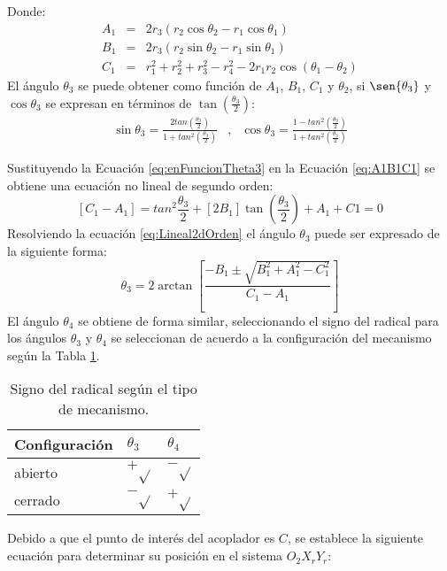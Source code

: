 Donde:
\begin{eqnarray}
A_1&=& 2r_3(r_2\cos{\theta_2}-r_1\cos{\theta_1}) \label{eq:A1} \\
B_1&=& 2r_3(r_2\sin{\theta_2}-r_1\sin{\theta_1}) \label{eq:B1} \\
C_1&=& r_1^2+r_2^2+r_3^2-r_4^2 -2r_1r_2\cos(\theta_1-\theta_2) \label{eq:C1}
\end{eqnarray}
El ángulo $\theta_3$ se puede obtener como función de $A_1$, $B_1$, $C_1$ y $\theta_2$, si $\sen{\theta_3}$ y $\cos{\theta_3}$  se expresan en términos de $\tan(\frac{\theta_3}{2})$:
\begin{eqnarray}
\sin{\theta_3}= \frac{2tan(\frac{\theta_3}{2})}{1+tan^2(\frac{\theta_3}{2})}&,& \cos{\theta_3}= \frac{1-tan^2(\frac{\theta_3}{2})}{1+tan^2(\frac{\theta_3}{2})} \label{eq:enFuncionTheta3}
\end{eqnarray}

Sustituyendo la Ecuación \ref{eq:enFuncionTheta3} en la Ecuación \ref{eq:A1B1C1} se obtiene una ecuación no lineal de segundo orden:
\begin{equation} \label{eq:Lineal2dOrden}
 \left[C_1 -A_1\right]= tan^2{\frac{\theta_3}{2}}+\left[2B_1\right]\tan{(\frac{\theta_3}{2})}+A_1+C1=0
\end{equation}
Resolviendo la ecuación \ref{eq:Lineal2dOrden} el ángulo $\theta_3$ puede ser expresado de la siguiente forma:
\begin{equation} \label{eq:Lineal2dOrden_resuelta}
\theta_3= 2\arctan \left[ \frac{-B_1 \pm \sqrt{B^2_1+A^2_1-C^2_1}}{C_1-A_1} \right]
\end{equation}
El ángulo $\theta_4$ se obtiene de forma similar, seleccionando el signo del radical para los
ángulos $\theta_3$ y $\theta_4$ se seleccionan de acuerdo a la configuración del mecanismo según
la Tabla \ref{tab:Signo del radical}.
\begin{table}[H]
\centering
\begin{tabular}{|l|l|l|}
\hline
\textbf{Configuración}& $\theta_3$& $\theta_4$  \\ \hline
abierto &  $+ \sqrt{}$&   $- \sqrt{}$  \\ \hline
cerrado & $- \sqrt{}$ & $ + \sqrt{}$  \\ \hline
\end{tabular}
\caption{Signo del radical según el tipo de mecanismo.}
\label{tab:Signo del radical}
\end{table}

Debido a que el punto de interés del acoplador es $C$, se establece la siguiente ecuación para determinar su posición en el sistema $O_2 X_r Y_r$:

